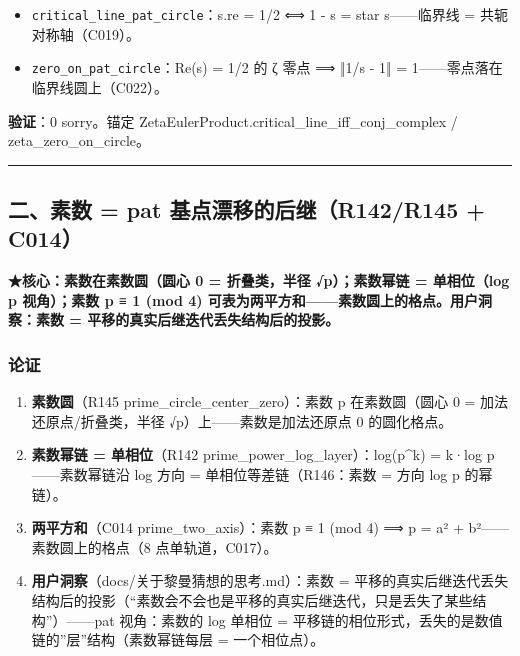 \documentclass[
]{article}
\providecommand{\tightlist}{%
  \setlength{\itemsep}{0pt}\setlength{\parskip}{0pt}}
\begin{document}
\begin{itemize}
\tightlist
\item
  \texttt{critical\_line\_pat\_circle}：s.re = 1/2 ⟺ 1 - s = star
  s------临界线 = 共轭对称轴（C019）。
\item
  \texttt{zero\_on\_pat\_circle}：Re(s) = 1/2 的 ζ 零点 ⟹ ‖1/s - 1‖ =
  1------零点落在临界线圆上（C022）。
\end{itemize}

\textbf{验证}：0 sorry。锚定
ZetaEulerProduct.critical\_line\_iff\_conj\_complex /
zeta\_zero\_on\_circle。

\begin{center}\rule{0.5\linewidth}{0.5pt}\end{center}

\subsection{二、素数 = pat 基点漂移的后继（R142/R145 +
C014）}\label{ux4e8cux7d20ux6570-pat-ux57faux70b9ux6f02ux79fbux7684ux540eux7ee7r142r145-c014}

\textbf{★核心：素数在素数圆（圆心 0 = 折叠类，半径 √p）；素数幂链 =
单相位（log p 视角）；素数 p ≡ 1 (mod 4)
可表为两平方和------素数圆上的格点。用户洞察：素数 =
平移的真实后继迭代丢失结构后的投影。}

\subsubsection{论证}\label{ux8bbaux8bc1-1}

\begin{enumerate}
\def\labelenumi{\arabic{enumi}.}
\tightlist
\item
  \textbf{素数圆}（R145 prime\_circle\_center\_zero）：素数 p
  在素数圆（圆心 0 = 加法还原点/折叠类，半径
  √p）上------素数是加法还原点 0 的圆化格点。
\item
  \textbf{素数幂链 = 单相位}（R142
  prime\_power\_log\_layer）：log(p\^{}k) = k·log p------素数幂链沿 log
  方向 = 单相位等差链（R146：素数 = 方向 log p 的幂链）。
\item
  \textbf{两平方和}（C014 prime\_two\_axis）：素数 p ≡ 1 (mod 4) ⟹ p =
  a² + b²------素数圆上的格点（8 点单轨道，C017）。
\item
  \textbf{用户洞察}（docs/关于黎曼猜想的思考.md）：素数 =
  平移的真实后继迭代丢失结构后的投影（``素数会不会也是平移的真实后继迭代，只是丢失了某些结构''）------pat
  视角：素数的 log 单相位 =
  平移链的相位形式，丢失的是数值链的''层''结构（素数幂链每层 =
  一个相位点）。
\end{enumerate}
\end{document}
